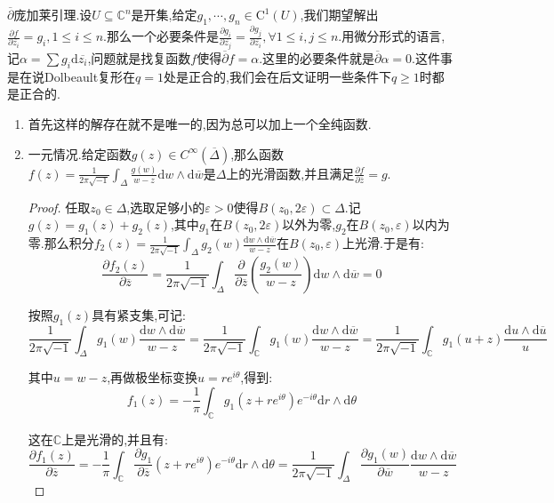 $\overline{\partial}$庞加莱引理.设$U\subseteq\mathbb{C}^n$是开集,给定$g_1,\cdots,g_n\in\mathrm{C}^1(U)$,我们期望解出$\frac{\partial f}{\partial\overline{z_i}}=g_i,1\le i\le n$.那么一个必要条件是$\frac{\partial g_i}{\partial\overline{z_j}}=\frac{\partial g_j}{\partial\overline{z_i}},\forall 1\le i,j\le n$.用微分形式的语言,记$\alpha=\sum g_i\mathrm{d}\overline{z_i}$,问题就是找复函数$f$使得$\overline{\partial}f=\alpha$.这里的必要条件就是$\overline{\partial}\alpha=0$.这件事是在说Dolbeault复形在$q=1$处是正合的,我们会在后文证明一些条件下$q\ge1$时都是正合的.
\begin{enumerate}
	\item 首先这样的解存在就不是唯一的,因为总可以加上一个全纯函数.
	\item 一元情况.给定函数$g(z)\in C^{\infty}(\overline{\Delta})$,那么函数$f(z)=\frac{1}{2\pi\sqrt{-1}}\int_{\Delta}\frac{g(w)}{w-z}\mathrm{d}w\wedge\mathrm{d}\overline{w}$是$\Delta$上的光滑函数,并且满足$\frac{\partial f}{\partial\overline{z}}=g$.
	\begin{proof}
		
		任取$z_0\in\Delta$,选取足够小的$\varepsilon>0$使得$B(z_0,2\varepsilon)\subset\Delta$.记$g(z)=g_1(z)+g_2(z)$,其中$g_1$在$B(z_0,2\varepsilon)$以外为零,$g_2$在$B(z_0,\varepsilon)$以内为零.那么积分$f_2(z)=\frac{1}{2\pi\sqrt{-1}}\int_{\Delta}g_2(w)\frac{\mathrm{d}w\wedge\mathrm{d}\overline{w}}{w-z}$在$B(z_0,\varepsilon)$上光滑.于是有:
		$$\frac{\partial f_2(z)}{\partial\overline{z}}=\frac{1}{2\pi\sqrt{-1}}\int_{\Delta}\frac{\partial}{\partial\overline{z}}\left(\frac{g_2(w)}{w-z}\right)\mathrm{d}w\wedge\mathrm{d}\overline{w}=0$$
		
		按照$g_1(z)$具有紧支集,可记:
		$$\frac{1}{2\pi\sqrt{-1}}\int_{\Delta}g_1(w)\frac{\mathrm{d}w\wedge\mathrm{d}\overline{w}}{w-z}=\frac{1}{2\pi\sqrt{-1}}\int_{\mathbb{C}}g_1(w)\frac{\mathrm{d}w\wedge\mathrm{d}\overline{w}}{w-z}=\frac{1}{2\pi\sqrt{-1}}\int_{\mathbb{C}}g_1(u+z)\frac{\mathrm{d}u\wedge\mathrm{d}\overline{u}}{u}$$
		
		其中$u=w-z$,再做极坐标变换$u=re^{i\theta}$,得到:
		$$f_1(z)=-\frac{1}{\pi}\int_{\mathbb{C}}g_1(z+re^{i\theta})e^{-i\theta}\mathrm{d}r\wedge\mathrm{d}\theta$$
		
		这在$\mathbb{C}$上是光滑的,并且有:
		$$\frac{\partial f_1(z)}{\partial\overline{z}}=-\frac{1}{\pi}\int_{\mathbb{C}}\frac{\partial g_1}{\partial\overline{z}}(z+re^{i\theta})e^{-i\theta}\mathrm{d}r\wedge\mathrm{d}\theta=\frac{1}{2\pi\sqrt{-1}}\int_{\Delta}\frac{\partial g_1(w)}{\partial\overline{w}}\frac{\mathrm{d}w\wedge\mathrm{d}\overline{w}}{w-z}$$
		

\end{proof}
\end{enumerate}
